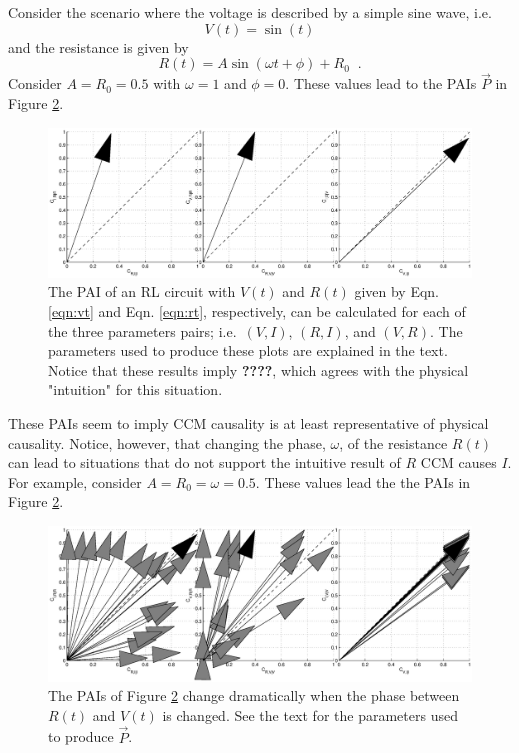 \documentclass[a4paper,11pt]{article}
\begin{document}
Consider the scenario where the voltage is described by a simple sine wave, i.e.\
\begin{equation}
\label{eqn:vt}
V(t) = \sin(t)
\end{equation}
and the resistance is given by
\begin{equation}
\label{eqn:rt}
R(t) = A\sin(\omega t + \phi) + R_0\;\;.
\end{equation}
Consider $A=R_0=0.5$ with $\omega=1$ and $\phi=0$.  These values lead to the PAIs $\vec{P}$ in Figure \ref{fig:}.  
\begin{figure}[ht]
\label{fig:}
\includegraphics[scale=0.45]{Figure4.eps}
\caption{The PAI of an RL circuit with $V(t)$ and $R(t)$ given by Eqn. \ref{eqn:vt} and Eqn. \ref{eqn:rt}, respectively, can be calculated for each of the three parameters pairs; i.e.\ $(V,I)$, $(R,I)$, and $(V,R)$.  The parameters used to produce these plots are explained in the text.  Notice that these results imply {\bf ????}, which agrees with the physical "intuition" for this situation.}
\end{figure}
These PAIs seem to imply CCM causality is at least representative of physical causality.  Notice, however, that changing the phase, $\omega$, of the resistance $R(t)$ can lead to situations that do not support the intuitive result of $R$ CCM causes $I$.  For example, consider $A=R_0=\omega=0.5$.  These values lead the the PAIs in Figure \ref{fig:}.
\begin{figure}[ht]
\label{fig:}
\includegraphics[scale=0.45]{Figure5.eps}
\caption{The PAIs of Figure \ref{fig:} change dramatically when the phase between $R(t)$ and $V(t)$ is changed.  See the text for the parameters used to produce $\vec{P}$.}
\end{figure}
\end{document}
